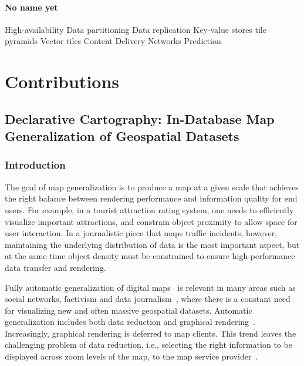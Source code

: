 \documentclass[11pt, oneside]{report}
\begin{document}
\subsection{No name yet}
High-availability
Data partitioning
Data replication
Key-value stores
tile pyramids
Vector tiles
Content Delivery Networks
Prediction






\part{Contributions}

\chapter{Declarative Cartography: In-Database Map Generalization of Geospatial Datasets}
\label{chapter:cvl}
\lstset{
  language=cvl
}

\section{Introduction}
\label{sec:cvl:introduction}
The goal of map generalization is to produce a map at a given scale that achieves the right balance between rendering performance and information quality for end users. For example, in a tourist attraction rating system, one needs to efficiently visualize important attractions, and constrain object proximity to allow space for user interaction. In a journalistic piece that maps traffic incidents, however, maintaining the underlying distribution of data is the most important aspect, but at the same time object density must be constrained to ensure high-performance data transfer and rendering.

Fully automatic generalization of digital maps~\cite{sarma2012fusiontables,nutanong2012multiresolution} is relevant in many areas such as social networks, factivism and data journalism~\cite{cohen2011journalism,bono,sankaranarayanan2009twitterstand}, where there is a constant need for visualizing new and often massive geospatial datasets. Automatic generalization includes both data reduction and graphical rendering~\cite{weibel1999generalising,gruenreich1985cag}. Increasingly, graphical rendering is deferred to map clients. This trend leaves the challenging problem of data reduction, i.e., selecting the right information to be displayed across zoom levels of the map, to the map service provider~\cite{gaffuri12vectortiles}. 
\end{document}
